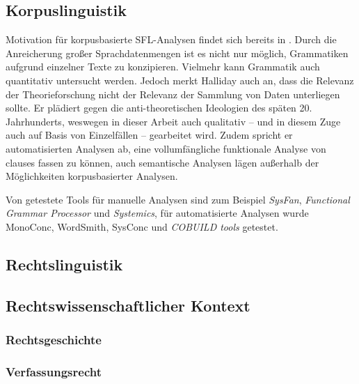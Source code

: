 \subsection{Korpuslinguistik}
\label{sec:2:kl}

Motivation für korpusbasierte SFL-Analysen findet sich bereits in \citet[34--35]{Halliday2004}. Durch die Anreicherung großer Sprachdatenmengen ist es nicht nur möglich, Grammatiken aufgrund einzelner Texte zu konzipieren. Vielmehr kann Grammatik auch quantitativ untersucht werden. Jedoch merkt Halliday auch an, dass die Relevanz der Theorieforschung nicht der Relevanz der Sammlung von Daten unterliegen sollte. Er plädiert gegen die anti-theoretischen Ideologien des späten 20. Jahrhunderts, weswegen in dieser Arbeit auch qualitativ -- und in diesem Zuge auch auf Basis von Einzelfällen -- gearbeitet wird. Zudem spricht er automatisierten Analysen ab, eine vollumfängliche funktionale Analyse von clauses fassen zu können, auch semantische Analysen lägen außerhalb der Möglichkeiten korpusbasierter Analysen.

Von \citet[49]{Halliday2004} getestete Tools für manuelle Analysen sind zum Beispiel \textit{SysFan}, \textit{Functional Grammar Processor} und \textit{Systemics}, für automatisierte Analysen wurde {MonoConc}, {WordSmith}, {SysConc} und \textit{COBUILD tools} getestet.

\subsection{Rechtslinguistik}
\label{sec:2:ll}

\subsection{Rechtswissenschaftlicher Kontext}

\subsubsection{Rechtsgeschichte}
\label{sec:2:rg}

\subsubsection{Verfassungsrecht}
\label{sec:2:vr}
